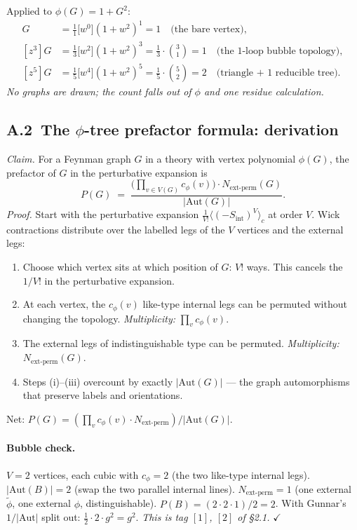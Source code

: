 \documentclass[11pt,a4paper]{article}
\newcommand{\ck}[1]{\textcolor{cntcol}{$[#1]$}}
\begin{document}
Applied to $\phi(G) = 1+G^{2}$:
\begin{align*}
[z^{1}]G &= \tfrac{1}{1}\bigl[w^{0}\bigr](1+w^{2})^{1} = 1 \quad\text{(the bare vertex)},\\
[z^{3}]G &= \tfrac{1}{3}\bigl[w^{2}\bigr](1+w^{2})^{3} = \tfrac{1}{3}\!\cdot\!\binom{3}{1} = 1 \quad\text{(the 1-loop bubble topology)},\\
[z^{5}]G &= \tfrac{1}{5}\bigl[w^{4}\bigr](1+w^{2})^{5} = \tfrac{1}{5}\!\cdot\!\binom{5}{2} = 2 \quad\text{(triangle + 1 reducible tree)}.
\end{align*}
\emph{No graphs are drawn; the count falls out of $\phi$ and one residue calculation.}

\subsection*{A.2\ The $\phi$-tree prefactor formula: derivation}

\textit{Claim.} For a Feynman graph $G$ in a theory with vertex polynomial $\phi(G)$,
the prefactor of $G$ in the perturbative expansion is
\[
\boxed{\;P(G) \;=\; \frac{\bigl(\prod_{v\in V(G)} c_{\phi}(v)\bigr)\cdot N_{\text{ext-perm}}(G)}{|\mathrm{Aut}(G)|}.\;}
\]
\textit{Proof.} Start with the perturbative expansion $\frac{1}{V!}\langle (-S_{\text{int}})^{V}\rangle_{c}$ at
order $V$. Wick contractions distribute over the labelled legs of the $V$ vertices and
the external legs:
\begin{enumerate}[itemsep=2pt,leftmargin=2em,label=(\roman*)]
\item Choose which vertex sits at which position of $G$: $V!$ ways. This cancels the
$1/V!$ in the perturbative expansion.
\item At each vertex, the $c_{\phi}(v)$ like-type internal legs can be permuted without
changing the topology. \emph{Multiplicity:} $\prod_v c_{\phi}(v)$.
\item The external legs of indistinguishable type can be permuted. \emph{Multiplicity:}
$N_{\text{ext-perm}}(G)$.
\item Steps (i)--(iii) overcount by exactly $|\mathrm{Aut}(G)|$ --- the graph automorphisms
that preserve labels and orientations.
\end{enumerate}
Net: $P(G) = (\prod_v c_{\phi}(v)\cdot N_{\text{ext-perm}})/|\mathrm{Aut}(G)|$.

\paragraph{Bubble check.} $V = 2$ vertices, each cubic with $c_{\phi}=2$ (the two like-type
internal legs). $|\mathrm{Aut}(B)| = 2$ (swap the two parallel internal lines).
$N_{\text{ext-perm}} = 1$ (one external $\widetilde\phi$, one external $\phi$, distinguishable).
$P(B) = (2\cdot 2\cdot 1)/2 = 2$. With Gunnar's $1/|\mathrm{Aut}|$ split out:
$\tfrac{1}{2}\cdot 2 \cdot g^{2} = g^{2}$. \emph{This is tag \ck{1}, \ck{2} of \S 2.1.} $\checkmark$
\end{document}
